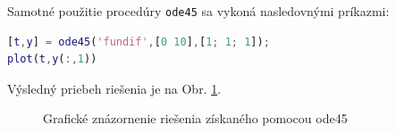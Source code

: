 \documentclass[a4paper, 10pt, ]{article}
\begin{document}
Samotné použitie procedúry \verb|ode45| sa vykoná nasledovnými príkazmi:
\begin{lstlisting}[language=Matlab,]
[t,y] = ode45('fundif',[0 10],[1; 1; 1]);
plot(t,y(:,1))
\end{lstlisting}
Výsledný priebeh riešenia je na Obr. \ref{Grafické znázornenie riešenia získaného pomocou ode45}.
\begin{figure}[!ht]
	\centering


    \caption{Grafické znázornenie riešenia získaného pomocou ode45}
	\label{Grafické znázornenie riešenia získaného pomocou ode45}
\end{figure}
\end{document}
